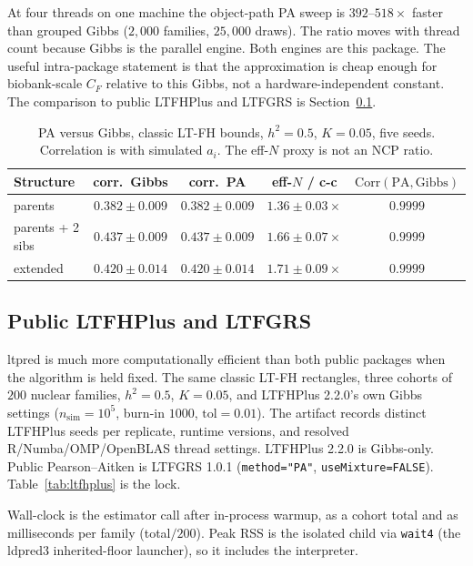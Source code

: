\documentclass[11pt,a4paper]{article}
\newcommand{\Corr}{\mathrm{Corr}}
\newcommand{\h}{h^{2}}
\begin{document}
At four threads on one machine the object-path PA sweep is
$392$--$518\times$ faster than grouped Gibbs
($2{,}000$ families, $25{,}000$ draws).
The ratio moves with thread count because Gibbs is the parallel
engine.
Both engines are this package.
The useful intra-package statement is that the approximation is
cheap enough for biobank-scale $C_F$ relative to this Gibbs, not
a hardware-independent constant.
The comparison to public LTFHPlus and LTFGRS is Section~\ref{sec:ltfhplus}.

\begin{table}[ht]
\centering
\caption{PA versus Gibbs, classic LT-FH bounds, $\h=0.5$, $K=0.05$,
five seeds.
Correlation is with simulated $a_i$.
The eff-$N$ proxy is not an NCP ratio.}
\label{tab:acc}
\small
\begin{tabular}{@{}lcccc@{}}
\toprule
Structure & corr.\ Gibbs & corr.\ PA &
eff-$N$ / c-c & $\Corr(\mathrm{PA},\mathrm{Gibbs})$ \\
\midrule
parents
  & $0.382\pm 0.009$ & $0.382\pm 0.009$
  & $1.36\pm 0.03\times$ & $0.9999$ \\
parents + 2 sibs
  & $0.437\pm 0.009$ & $0.437\pm 0.009$
  & $1.66\pm 0.07\times$ & $0.9999$ \\
extended
  & $0.420\pm 0.014$ & $0.420\pm 0.014$
  & $1.71\pm 0.09\times$ & $0.9999$ \\
\bottomrule
\end{tabular}
\end{table}

\subsection{Public LTFHPlus and LTFGRS}
\label{sec:ltfhplus}

ltpred is much more computationally efficient than both public
packages when the algorithm is held fixed.
The same classic LT-FH rectangles, three cohorts of $200$ nuclear
families, $\h=0.5$, $K=0.05$, and LTFHPlus 2.2.0's own Gibbs
settings ($n_{\mathrm{sim}}=10^{5}$, burn-in $1000$,
$\mathrm{tol}=0.01$).
The artifact records distinct LTFHPlus seeds per replicate, runtime
versions, and resolved R/Numba/OMP/OpenBLAS thread settings.
LTFHPlus 2.2.0 is Gibbs-only.
Public Pearson--Aitken is LTFGRS 1.0.1
(\texttt{method="PA"}, \texttt{useMixture=FALSE}).
Table~\ref{tab:ltfhplus} is the lock.

Wall-clock is the estimator call after in-process warmup, as a
cohort total and as milliseconds per family (total$/200$).
Peak RSS is the isolated child via \texttt{wait4} (the ldpred3
inherited-floor launcher), so it includes the interpreter.
\end{document}
